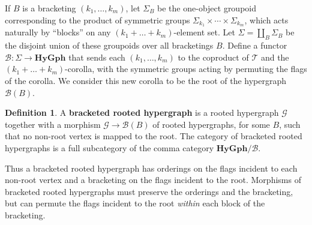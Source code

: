 \documentclass{article}
\theoremstyle{definition}
\newtheorem{defn}[thm]{Definition}
\theoremstyle{remark}
\def\G{\mathcal{G}}
\def\hy{\mathbf{HyGph}}
\def\thy{\mathcal{T}}
\def\bhy{\mathcal{B}}
\begin{document}
If $B$ is a bracketing $(k_1,\dots,k_m)$, let $\Sigma_B$ be the one-object groupoid corresponding to the product of symmetric groups $\Sigma_{k_1} \times \cdots \times \Sigma_{k_m}$, which acts naturally by ``blocks'' on any $(k_1+\dots+k_m)$-element set.
Let $\Sigma = \coprod_B \Sigma_B$ be the disjoint union of these groupoids over all bracketings $B$.
Define a functor $\bhy : \Sigma \to \hy$ that sends each $(k_1,\dots,k_m)$ to the coproduct of $\thy$ and the $(k_1+\dots+k_m)$-corolla, with the symmetric groups acting by permuting the flags of the corolla.
We consider this new corolla to be the root of the hypergraph $\bhy(B)$.

\begin{defn}
  A \textbf{bracketed rooted hypergraph} is a rooted hypergraph $\G$ together with a morphism $\G\to\bhy(B)$ of rooted hypergraphs, for some $B$, such that no non-root vertex is mapped to the root.
  The category of bracketed rooted hypergraphs is a full subcategory of the comma category $\hy/\bhy$.
\end{defn}

Thus a bracketed rooted hypergraph has orderings on the flags incident to each non-root vertex and a bracketing on the flags incident to the root.
Morphisms of bracketed rooted hypergraphs must preserve the orderings and the bracketing, but can permute the flags incident to the root \emph{within} each block of the bracketing.
\end{document}
